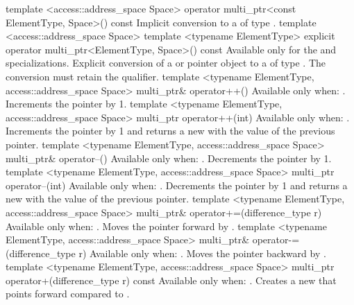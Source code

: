 \addRowTwoL
{template <access::address_space Space>}
{operator multi_ptr<const ElementType, Space>() const}
{Implicit conversion to a 
of type .}
\addRowThreeL
{template <access::address_space Space>}
{template <typename ElementType>}
{explicit operator multi_ptr<ElementType, Space>() const}
{Available only for the 
and  specializations.
\newline
Explicit conversion of a 
or  pointer object to a
 of type .}
The conversion must retain the  qualifier.
\addRowTwoL
{template <typename ElementType, access::address_space Space>}
{multi_ptr\& operator++()}
{Available only when: .
\newline
Increments the pointer by 1.}
\addRowTwoL
{template <typename ElementType, access::address_space Space>}
{multi_ptr operator++(int)}
{Available only when: .
\newline
Increments the pointer by 1 and returns a new 
with the value of the previous pointer.}
\addRowTwoL
{template <typename ElementType, access::address_space Space>}
{multi_ptr\& operator--()}
{Available only when: .
\newline
Decrements the pointer by 1.}
\addRowTwoL
{template <typename ElementType, access::address_space Space>}
{multi_ptr operator--(int)}
{Available only when: .
\newline
Decrements the pointer by 1 and returns a new 
with the value of the previous pointer.}
\addRowTwoL
{template <typename ElementType, access::address_space Space>}
{multi_ptr\& operator+=(difference_type r)}
{Available only when: .
\newline
Moves the pointer forward by .}
\addRowTwoL
{template <typename ElementType, access::address_space Space>}
{multi_ptr\& operator-=(difference_type r)}
{Available only when: .
\newline
Moves the pointer backward by .}
\addRowTwoL
{template <typename ElementType, access::address_space Space>}
{multi_ptr operator+(difference_type r) const}
{Available only when: .
\newline
Creates a new  that points  forward
compared to .}
